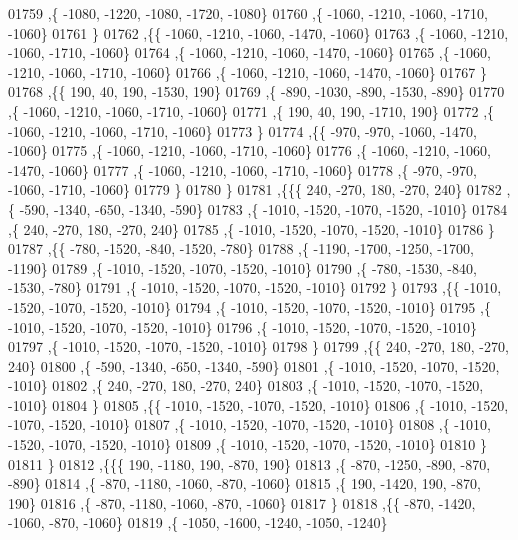 \begin{DoxyCode}
01759     ,\{ -1080, -1220, -1080, -1720, -1080\}
01760     ,\{ -1060, -1210, -1060, -1710, -1060\}
01761     \}
01762    ,\{\{ -1060, -1210, -1060, -1470, -1060\}
01763     ,\{ -1060, -1210, -1060, -1710, -1060\}
01764     ,\{ -1060, -1210, -1060, -1470, -1060\}
01765     ,\{ -1060, -1210, -1060, -1710, -1060\}
01766     ,\{ -1060, -1210, -1060, -1470, -1060\}
01767     \}
01768    ,\{\{   190,    40,   190, -1530,   190\}
01769     ,\{  -890, -1030,  -890, -1530,  -890\}
01770     ,\{ -1060, -1210, -1060, -1710, -1060\}
01771     ,\{   190,    40,   190, -1710,   190\}
01772     ,\{ -1060, -1210, -1060, -1710, -1060\}
01773     \}
01774    ,\{\{  -970,  -970, -1060, -1470, -1060\}
01775     ,\{ -1060, -1210, -1060, -1710, -1060\}
01776     ,\{ -1060, -1210, -1060, -1470, -1060\}
01777     ,\{ -1060, -1210, -1060, -1710, -1060\}
01778     ,\{  -970,  -970, -1060, -1710, -1060\}
01779     \}
01780    \}
01781   ,\{\{\{   240,  -270,   180,  -270,   240\}
01782     ,\{  -590, -1340,  -650, -1340,  -590\}
01783     ,\{ -1010, -1520, -1070, -1520, -1010\}
01784     ,\{   240,  -270,   180,  -270,   240\}
01785     ,\{ -1010, -1520, -1070, -1520, -1010\}
01786     \}
01787    ,\{\{  -780, -1520,  -840, -1520,  -780\}
01788     ,\{ -1190, -1700, -1250, -1700, -1190\}
01789     ,\{ -1010, -1520, -1070, -1520, -1010\}
01790     ,\{  -780, -1530,  -840, -1530,  -780\}
01791     ,\{ -1010, -1520, -1070, -1520, -1010\}
01792     \}
01793    ,\{\{ -1010, -1520, -1070, -1520, -1010\}
01794     ,\{ -1010, -1520, -1070, -1520, -1010\}
01795     ,\{ -1010, -1520, -1070, -1520, -1010\}
01796     ,\{ -1010, -1520, -1070, -1520, -1010\}
01797     ,\{ -1010, -1520, -1070, -1520, -1010\}
01798     \}
01799    ,\{\{   240,  -270,   180,  -270,   240\}
01800     ,\{  -590, -1340,  -650, -1340,  -590\}
01801     ,\{ -1010, -1520, -1070, -1520, -1010\}
01802     ,\{   240,  -270,   180,  -270,   240\}
01803     ,\{ -1010, -1520, -1070, -1520, -1010\}
01804     \}
01805    ,\{\{ -1010, -1520, -1070, -1520, -1010\}
01806     ,\{ -1010, -1520, -1070, -1520, -1010\}
01807     ,\{ -1010, -1520, -1070, -1520, -1010\}
01808     ,\{ -1010, -1520, -1070, -1520, -1010\}
01809     ,\{ -1010, -1520, -1070, -1520, -1010\}
01810     \}
01811    \}
01812   ,\{\{\{   190, -1180,   190,  -870,   190\}
01813     ,\{  -870, -1250,  -890,  -870,  -890\}
01814     ,\{  -870, -1180, -1060,  -870, -1060\}
01815     ,\{   190, -1420,   190,  -870,   190\}
01816     ,\{  -870, -1180, -1060,  -870, -1060\}
01817     \}
01818    ,\{\{  -870, -1420, -1060,  -870, -1060\}
01819     ,\{ -1050, -1600, -1240, -1050, -1240\}

\end{DoxyCode}
